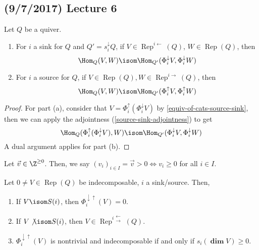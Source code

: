 \documentclass[11pt,leqno,oneside]{amsbook}
\numberwithin{thm}{section}
\newcommand{\Rep}{\operatorname{Rep}} %
\renewcommand{\Q}{Q} %
\newcommand{\grdim}{\boldsymbol{\dim}} %
\newcommand{\sinktosource}{s^\downarrow} %
\newcommand{\sinktosourcefunc}{\Phi^\downarrow} %
\newcommand{\sourcetosinkfunc}{\Phi^\uparrow} %
\newcommand{\sinksourcefunc}{\Phi^{\downarrow \uparrow}} %
\begin{document}
\subsection*{(9/7/2017) Lecture 6}
\begin{prop}
  Let \(\Q\) be a quiver.
  \begin{enumerate}
  \item For \(i\) a sink for \(\Q\) and \(\Q' = \sinktosource_i \Q\),
     if \(V \in \Rep^{i
      \leftarrow}(\Q)\), \(W \in \Rep(\Q)\), then \[
      \Hom_\Q(V,W) \isom \Hom_{\Q'}(\sinktosourcefunc_i V,
      \sinktosourcefunc_i W)
    \]
  \item For \(i\) a source for \(\Q\), if \(V \in \Rep(\Q), W \in
    \Rep^{i \rightarrow}(\Q)\), then \[
      \Hom_\Q(V,W) \isom \Hom_{\Q'}(\sourcetosinkfunc_i V,
      \sourcetosinkfunc_i W)
    \]
  \end{enumerate}
\end{prop}
\begin{proof}
  For part (a), consider that \(V =
  \sourcetosinkfunc_i(\sinktosourcefunc_i V)\) by
  \ref{equiv-of-cats-source-sink}, then we can apply the adjointness 
  (\ref{source-sink-adjointness}) to get \[
    \Hom_\Q(\sourcetosinkfunc_i(\sinktosourcefunc_i V), W) \isom
    \Hom_{\Q'}(\sinktosourcefunc_i V, \sinktosourcefunc_i W)
  \]
  A dual argument applies for part (b).
\end{proof}
\begin{defn}\label{choice-of-positive}
  Let \(\vec{v} \in \Z^{\geq 0}\). Then, we say \((v_i)_{i \in I} =
  \vec{v} > 0 \iff v_i \geq 0\) for all \(i \in I\).
\end{defn}
\begin{prop}\label{indec-are-pos}
  Let \(0 \neq V \in \Rep(\Q)\) be indecomposable, \(i\) a sink/source. Then,
  \begin{enumerate}
  \item If \(V \isom S(i)\), then \(\sinksourcefunc_i(V) = 0\).
  \item If \(V \not\isom S(i)\), then \(V \in \Rep^{i
      \substack{\leftarrow \\ \rightarrow}}(\Q)\).
  \item \(\sinksourcefunc_i(V)\) is nontrivial and indecomposable if
    and only if \(s_i(\grdim V) \geq 0\).
  \end{enumerate}
\end{prop}
\end{document}
